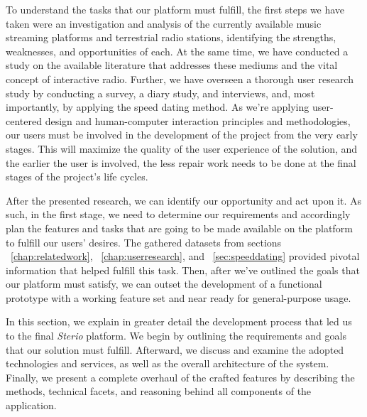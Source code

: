 \cleardoublepage
\label{chap:steriosystem}

To understand the tasks that our platform must fulfill, the first steps we have taken were an investigation and analysis of the currently available music streaming platforms and terrestrial radio stations, identifying the strengths, weaknesses, and opportunities of each. At the same time, we have conducted a study on the available literature that addresses these mediums and the vital concept of interactive radio. Further, we have overseen a thorough user research study by conducting a survey, a diary study, and interviews, and, most importantly, by applying the speed dating method. As we're applying user-centered design and human-computer interaction principles and methodologies, our users must be involved in the development of the project from the very early stages. This will maximize the quality of the user experience of the solution, and the earlier the user is involved, the less repair work needs to be done at the final stages of the project's life cycles.~\cite{Courage2005}

After the presented research, we can identify our opportunity and act upon it. As such, in the first stage, we need to determine our requirements and accordingly plan the features and tasks that are going to be made available on the platform to fulfill our users' desires. The gathered datasets from sections ~\ref{chap:relatedwork}, ~\ref{chap:userresearch}, and ~\ref{sec:speeddating} provided pivotal information that helped fulfill this task. Then, after we've outlined the goals that our platform must satisfy, we can outset the development of a functional prototype with a working feature set and near ready for general-purpose usage.

In this section, we explain in greater detail the development process that led us to the final \textit{Sterio} platform. We begin by outlining the requirements and goals that our solution must fulfill. Afterward, we discuss and examine the adopted technologies and services, as well as the overall architecture of the system. Finally, we present a complete overhaul of the crafted features by describing the methods, technical facets, and reasoning behind all components of the application.


